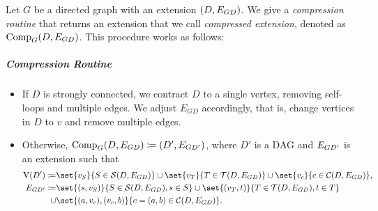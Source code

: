 \begin{theorem}
\begin{lemma}
\begin{theorem}
\begin{comment}
\begin{definition}[Compression]\label{def:comp}
  Let $G$ be a directed graph with an acyclic extension $\dexpair$ and $\dsccset \ne \emptyset$. We define the \emph{compressed extension}, denoted as $\dcompG$, as follows.

  If $\abs{\ve{D}} = 1$, we set $\dcompG \coloneqq \dexpair$.\jonas{If D is strongly connected, compress to single vertex}
  Otherwise, we create a new DAG $D'$ and a new set $\exset{G}{D'}$ with 
  \[
  \ve{D'} \coloneqq \set{v_S}{S \in \source{D}} \cup \set{v_T}{T \in \source{D}} \cup \set{v_c}{c \in \conn{D}}.\]

  The set $\exset{G}{D'}$ contains pairs $(s, v_S)$ for $S \in \source{D}$ and  $s \in S$ as well as $(v_T, t)$ for $T \in \sink{D}$ and $t \in T$.
  Additionally, for $(a,b) \in \conn{D}$, it contains $(a, v_{(a,b)})$ and $(v_{(a,b)}, b)$.

  Add an edge from $v_S$ to $v_T$, if there is a source $s$ and a sink $t$ in $D$ such that there is an $s$-$t$-path in $D$.

  For $c = (a,b) \in \conn{D}$, let $s_c \in \ve{D}, S \coloneqq \inNeiG{\dexset}{s_c}$ be a source such that for every $v \in S$, there is $(v, b) \in \conn{D}$. Similarly, let $t_c \in \ve{D}$ be a sink with $T \coloneqq \outNeiG{\dexset}{t_c}$ such that $(a,v) \in \conn{D}$ for $v \in T$. We add edges $(v_S, v_c), (v_c, v_T)$ to $\e{D'}$.
\end{definition}
\todo{S: IT's not a definition but a procedure to compress. Rewrite }
\end{comment}

Let $G$ be a directed graph with an extension $({D}, E_{{G}{D}})$. We give a \emph{compression routine} that returns an extension that we call \emph{compressed extension}, denoted as $\operatorname{\textrm{Comp}}_{G}({D}, {E_{{G}{D}}})$. This procedure works as follows:
\subparagraph*{Compression Routine}
\begin{itemize}
    \item  If $D$ is strongly connected, we contract $D$ to a single vertex, removing self-loops and multiple edges. We adjust $E_{GD}$ accordingly, that is, change vertices in $D$ to $v$ and remove multiple edges.
      
    \item Otherwise,  $\operatorname{\textrm{Comp}}_{G}({D}, {E_{{G}{D}}}) \coloneqq (D',E_{{G}{D'}})$, where $D'$ is a DAG and  $E_{{G}{D'}}$ is an extension such that
    \begin{align*}
  \ve{D'} \coloneqq &\set{v_S}{S \in \source{D,\dexset}} \cup \set{v_T}{T \in \sink{D,\dexset}} \cup \set{v_c}{c \in \conn{D,\dexset}},\\
  \exset{G}{D'} \coloneqq &\set{(s,v_S)}{S\in \source{D,\dexset}, s\in S} \cup \set{(v_T,t)}{T\in \sink{D,\dexset}, t\in T }\\
   \cup &\set{(a,v_c),(v_c,b)}{c=(a,b) \in \conn{D,\dexset}}.
    \end{align*}


\end{itemize}
\end{theorem}
\end{lemma}
\end{theorem}
